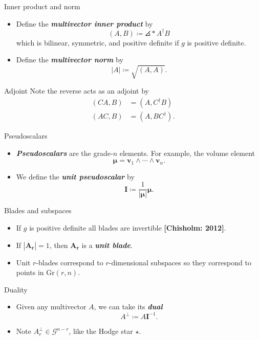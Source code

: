 \documentclass[aspectratio=169]{beamer}
\newcommand\boldgreen[1]{\textcolor{lighter_csu_green}{\emph{\textbf{#1}}}}
\newcommand\boldgold[1]{\textcolor{csu_gold}{\textbf{#1}}}
\newcommand{\G}{\mathcal{G}}
\newcommand{\Grassmannian}[2]{\textrm{Gr}(#1,#2)}
\newcommand{\blade}[1]{\boldsymbol{#1}}
\newcommand{\pseudoscalar}{\blade{I}}
\DeclarePairedDelimiter\angles{\langle}{\rangle}
\newcommand{\proj}[2]{\angles*{#2}_{#1}}
\begin{document}
\begin{frame}{Inner product and norm}
\vfill
\begin{itemize}
\pause
\item Define the \boldgreen{multivector inner product} by
\[
(A,B) \coloneqq \proj{}{A^\dagger B}
\]
which is bilinear, symmetric, and positive definite if $g$ is positive definite. 
\pause
\item Define the \boldgreen{multivector norm} by
\[
|A| \coloneqq \sqrt{(A,A)}.
\]
\end{itemize}
\vfill
\end{frame}

\begin{frame}{Adjoint}
\vfill
Note the reverse acts as an adjoint by
\begin{align*}
(CA,B) &= (A,C^\dagger B)\\
(AC,B) &= (A,BC^\dagger).
\end{align*}
\vfill
\end{frame}

\begin{frame}{Pseudoscalars}
\vfill
\begin{itemize}
\pause
\item \boldgreen{Pseudoscalars} are the grade-$n$ elements. For example, the volume element 
\[
\blade{\mu} = \blade{v}_1 \wedge \cdots \wedge \blade{v}_n.
\]
\pause  
\item We define the \boldgreen{unit pseudoscalar} by 
\[
\pseudoscalar \coloneqq \frac{1}{|\blade{\mu}|} \blade{\mu}.
\]
\end{itemize}
\vfill
\end{frame}

\begin{frame}{Blades and subspaces}
\vfill
\begin{itemize}
\pause
\item If $g$ is positive definite all blades are invertible \boldgold{[Chisholm: 2012]}.
\pause
\item If $|\blade{A_r}|=1$, then $\blade{A_r}$ is a \boldgreen{unit blade}. 
\pause
\item Unit $r$-blades correspond to $r$-dimensional subspaces so they correspond to points in $\Grassmannian{r}{n}$.
\end{itemize}
\vfill
\end{frame}

\begin{frame}{Duality}
\vfill
\begin{itemize}
\pause
\item Given any multivector $A$, we can take its \boldgreen{dual}
\[
A^\perp \coloneqq A \pseudoscalar^{-1}.
\]
\pause
\item Note $A_r^\perp \in \G^{n-r}$, like the Hodge star $\star$.
\end{itemize}
\vfill
\end{frame}
\end{document}
